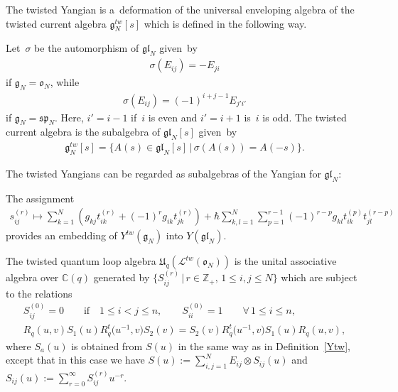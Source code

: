 \documentclass[pdftex]{sigma}
\numberwithin{theorem}{section}
\numberwithin{proposition}{section}
\numberwithin{lemma}{section}
\numberwithin{corollary}{section}
\numberwithin{definition}{section}
\numberwithin{example}{section}
\numberwithin{remark}{section}
\numberwithin{note}{section}
\numberwithin{equation}{section}
\begin{document}
The twisted Yangian is a~deformation of the universal enveloping algebra of the twisted current algebra
$\mathfrak{g}_N^{tw}[s]$ which is def\/ined in the following way.

\begin{definition}
Let~$\sigma$ be the automorphism of $\mathfrak{gl}_N$ given~by
\begin{gather}
\label{orthauto}
\sigma(E_{ij})=-E_{ji}
\end{gather}
if $\mathfrak{g}_N=\mathfrak{o}_N$, while
\begin{gather}
\label{sympauto}
\sigma(E_{ij})=(-1)^{i+j-1}E_{j'i'}
\end{gather}
if $\mathfrak{g}_N=\mathfrak{sp}_N$.
Here, $i'=i-1$ if~$i$ is even and $i'=i+1$ is~$i$ is odd.
The twisted current algebra is the subalgebra of $\mathfrak{gl}_N[s]$ given~by
\begin{gather*}
\mathfrak{g}_N^{tw}[s] = \{A(s) \in \mathfrak{gl}_N[s] \,|\, \sigma(A(s))=A(-s)\}.
\end{gather*}
\end{definition}

The twisted Yangians can be regarded as subalgebras of the Yangian for $\mathfrak{gl}_N$:

\begin{proposition}[\cite{Ol}]
\label{embY}
The assignment
\begin{gather*}
s_{ij}^{(r)} \mapsto \sum\limits_{k=1}^N \left(g_{kj}t_{ik}^{(r)} + (-1)^r g_{ik} t_{jk}^{(r)} \right) + \hbar
\sum\limits_{k,l=1}^N \sum\limits_{p=1}^{r-1} (-1)^{r-p} g_{kl} t_{ik}^{(p)} t_{jl}^{(r-p)}
\end{gather*}
provides an embedding of $Y^{tw}(\mathfrak{g}_N)$ into $Y(\mathfrak{gl}_N)$.
\end{proposition}

\begin{definition}
\label{Uqon}
The twisted quantum loop algebra $\mathfrak{U}_q(\mathcal{L}^{tw}(\mathfrak{o}_N))$ is the unital associative algebra
over $\mathbb{C}(q)$ generated by $\{S_{ij}^{(r)} \,|\, r \in \mathbb{Z}_+, \, 1 \leq i, j \leq N\}$ which are subject to the
relations
\begin{gather*}
S_{ij}^{(0)}=0 \qquad \text{if} \quad  1 \leq i < j \leq n,
\qquad
S_{ii}^{(0)}=1 \qquad \forall\,  1 \leq i \leq n,
\\
R_q(u,v)S_1(u)R_q^t\big(u^{-1},v\big)S_2(v)=S_2(v)R_q^t\big(u^{-1},v\big)S_1(u)R_q(u,v),
\end{gather*}
where $S_a(u)$ is obtained from $S(u)$ in the same way as in Def\/inition~\ref{Ytw}, except that in this case we have
$S(u):=\sum\limits_{i,j=1}^N E_{ij} \otimes S_{ij}(u)$ and $S_{ij}(u):=\sum\limits_{r=0}^\infty S_{ij}^{(r)}u^{-r}$.
\end{definition}
\end{document}
